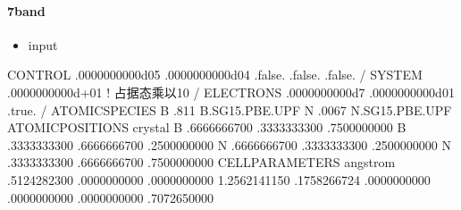 \documentclass[a4paper,12pt,english]{sphinxmanual}
\begin{document}
\paragraph{7\sphinxhyphen{}band}
\label{\detokenize{tutorials/berkeleygw/gw:band}}\begin{itemize}
\item {} 
\sphinxAtStartPar
input

\end{itemize}

\begin{sphinxVerbatim}[commandchars=\\\{\}]
CONTROL
    
      .0000000000d\PYGZhy{}05
      .0000000000d\PYGZhy{}04
    
    
    
    
    .false.
    .false.
    
    .false.
/
SYSTEM
      .0000000000d+01
    
    
    
                       ! 占据态乘以10
/
ELECTRONS
      .0000000000d\PYGZhy{}7
    
      .0000000000d\PYGZhy{}01
    
    
    
    .true.
/
ATOMIC\PYGZus{}SPECIES
B      .811 B.SG15.PBE.UPF
N      .0067 N.SG15.PBE.UPF
ATOMIC\PYGZus{}POSITIONS crystal
B            .6666666700       .3333333300       .7500000000
B            .3333333300       .6666666700       .2500000000
N            .6666666700       .3333333300       .2500000000
N            .3333333300       .6666666700       .7500000000
CELL\PYGZus{}PARAMETERS angstrom
      .5124282300       .0000000000       .0000000000
     \PYGZhy{}1.2562141150       .1758266724       .0000000000
      .0000000000       .0000000000       .7072650000


\end{sphinxVerbatim}
\end{document}
